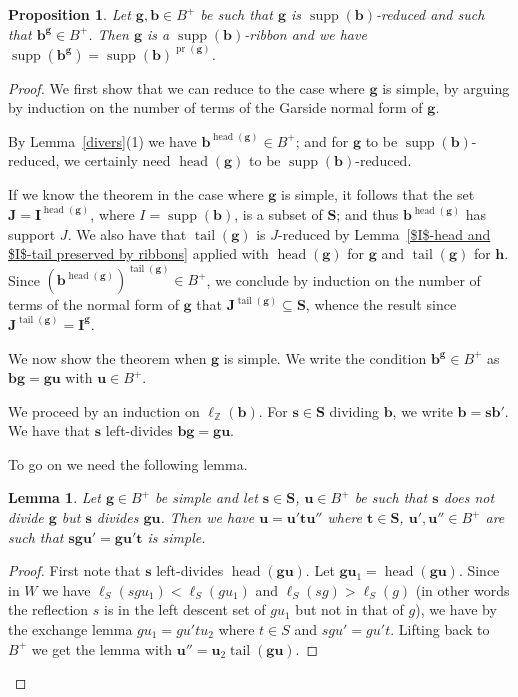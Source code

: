 \documentclass{amsart}
\numberwithin{equation}{section}
\newtheorem{lemma}[equation]{Lemma}
\newtheorem{proposition}[equation]{Proposition}
\newcommand\lZ{{\ell_{\BZ}}}
\newcommand\bb{{\mathbf b}}
\newcommand\bg{{\mathbf g}}
\newcommand\bh{{\mathbf h}}
\newcommand\bs{{\mathbf s}}
\newcommand\bt{{\mathbf t}}
\newcommand\bu{{\mathbf u}}
\newcommand\bI{{\mathbf I}}
\newcommand\bJ{{\mathbf J}}
\newcommand\bS{{\mathbf S}}
\newcommand\BZ{{\mathbb Z}}
\DeclareMathOperator\pr{pr}
\DeclareMathOperator\supp{supp}
\DeclareMathOperator\head{head}
\DeclareMathOperator\tail{tail}
\begin{document}
\begin{proposition}\label{Positive conjugate implies ribbon}
Let $\bg,\bb\in B^+$ be such that $\bg$ is $\supp(\bb)$-reduced
and such that $\bb^\bg\in B^+$. 
Then $\bg$ is  a $\supp(\bb)$-ribbon and we have $\supp(\bb^\bg)=\supp(\bb)^{\pr(\bg)}$.
\end{proposition}
\begin{proof}
We first show that we can reduce to the case where $\bg$ is simple, by arguing
by induction on the number of terms of the Garside normal form of $\bg$.

By Lemma~\ref{divers}(1) we have $\bb^{\head(\bg)}\in B^+$; 
and for $\bg$  to  be  $\supp(\bb)$-reduced,  we  certainly  need  $\head(\bg)$
to be $\supp(\bb)$-reduced. 

If we know the theorem in the case where $\bg$ is simple,
it    follows    that the set $\bJ=\bI^{\head(\bg)}$, where $I=\supp(\bb)$,
is a subset of $\bS$;    and    thus
$\bb^{\head(\bg)}$  has  support  $J$.  We  also  have  that  $\tail(\bg)$ is
 $J$-reduced by Lemma~\ref{$I$-head and $I$-tail preserved by ribbons}
 applied with $\head(\bg)$ for $\bg$ and $\tail(\bg)$ for $\bh$. Since
$(\bb^{\head(\bg)})^{\tail(\bg)}\in B^+$,  we conclude by induction on the number
of  terms  of  the  normal  form of $\bg$ that $\bJ^{\tail(\bg)}\subseteq \bS$,
 whence the result since $\bJ^{\tail(\bg)}= \bI^\bg$.

We now show the theorem when $\bg$ is simple. We write the condition
$\bb^\bg\in B^+$ as $\bb\bg=\bg\bu$ with $\bu\in B^+$.

 We proceed by an induction on $\lZ(\bb)$. For $\bs\in \bS$ dividing $\bb$,
we write $\bb=\bs \bb'$. We have that $\bs$ left-divides $\bb\bg=\bg\bu$.

To go on we need the following lemma.
\begin{lemma}Let  $\bg\in B^+$ be simple and let $\bs\in \bS$, $\bu\in B^+$
be  such that $\bs$ does not divide $\bg$  but $\bs$ divides $\bg\bu$. Then
we   have   $\bu=\bu'\bt   \bu''$   where   $\bt\in  \bS$, $\bu',\bu''\in B^+$
are such  that  $\bs \bg\bu'=\bg\bu'\bt$ is simple.
\end{lemma} 
\begin{proof}
First  note  that  $\bs$ left-divides $\head(\bg \bu)$. Let $\bg\bu_1=\head(\bg\bu)$.
Since in $W$ we have $\ell_S(sgu_1)<\ell_S(gu_1)$ and $\ell_S(sg)>\ell_S(g)$   (in other words the reflection  $s$ is in the left descent  set of $gu_1$ but
not  in that  of $g$), we have  by the exchange lemma $gu_1=gu't u_2$ where
$t\in  S$ and  $sgu'=gu't$. Lifting  back to  $B^+$ we  get the  lemma with
$\bu''= \bu_2\tail(\bg\bu)$. \end{proof}


\end{proof}
\end{document}
